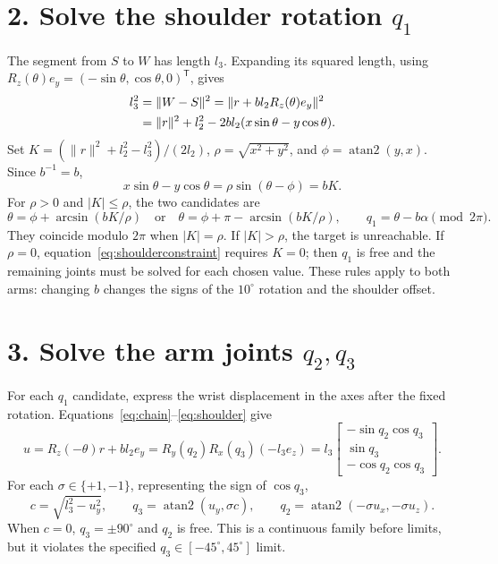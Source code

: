 \documentclass[10pt,a4paper]{article}
\begin{document}
\section*{2. Solve the shoulder rotation $q_1$}
The segment from $S$ to $W$ has length $l_3$. Expanding its squared length,
using $R_z(\theta)e_y=(-\sin\theta,\cos\theta,0)^\mathsf{T}$, gives
\begin{align}
l_3^2&=\|W-S\|^2
=\|r+b l_2R_z(\theta)e_y\|^2 \notag\\
&=\|r\|^2+l_2^2-2b l_2(x\sin\theta-y\cos\theta).
\end{align}
Set $K=(\|r\|^2+l_2^2-l_3^2)/(2l_2)$,
$\rho=\sqrt{x^2+y^2}$, and $\phi=\operatorname{atan2}(y,x)$. Since
$b^{-1}=b$,
\begin{equation}
x\sin\theta-y\cos\theta
=\rho\sin(\theta-\phi)=bK.
\label{eq:shoulderconstraint}
\end{equation}
For $\rho>0$ and $|K|\leq\rho$, the two candidates are
\begin{equation}
\theta=\phi+\arcsin(bK/\rho)
\quad\text{or}\quad
\theta=\phi+\pi-\arcsin(bK/\rho),
\qquad q_1=\theta-b\alpha\pmod{2\pi}.
\label{eq:q1}
\end{equation}
They coincide modulo $2\pi$ when $|K|=\rho$. If $|K|>\rho$, the target is
unreachable. If $\rho=0$, equation~\eqref{eq:shoulderconstraint} requires
$K=0$; then $q_1$ is free and the remaining joints must be solved for each
chosen value. These rules apply to both arms: changing $b$ changes the signs
of the $10^\circ$ rotation and the shoulder offset.

\section*{3. Solve the arm joints $q_2,q_3$}
For each $q_1$ candidate, express the wrist displacement in the axes after
the fixed rotation. Equations~\eqref{eq:chain}--\eqref{eq:shoulder} give
\begin{equation}
u=R_z(-\theta)r+b l_2e_y
=R_y(q_2)R_x(q_3)(-l_3e_z)
=l_3\begin{bmatrix}
-\sin q_2\cos q_3\\ \sin q_3\\ -\cos q_2\cos q_3
\end{bmatrix}.
\label{eq:u}
\end{equation}
For each $\sigma\in\{+1,-1\}$, representing the sign of $\cos q_3$,
\begin{equation}
c=\sqrt{l_3^2-u_y^2},\qquad
q_3=\operatorname{atan2}(u_y,\sigma c),\qquad
q_2=\operatorname{atan2}(-\sigma u_x,-\sigma u_z).
\label{eq:q23}
\end{equation}
When $c=0$, $q_3=\pm90^\circ$ and $q_2$ is free. This is a continuous
family before limits, but it violates the specified $q_3\in[-45^\circ,45^\circ]$
limit.
\end{document}
